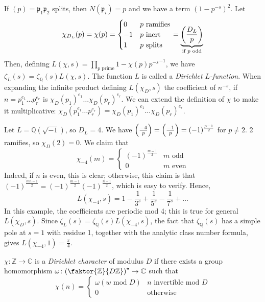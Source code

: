 If \( (p) = \mathfrak p_1 \mathfrak p_2 \) splits, then \( N(\mathfrak p_i) = p \) and we have a term \( (1 - p^{-s})^2 \).
Let
\[ \chi_{D_L}(p) = \chi(p) = \begin{cases}
    0 & p \text{ ramifies} \\
    -1 & p \text{ inert} \\
    1 & p \text{ splits}
\end{cases} = \underbrace{\qty(\frac{D_L}{p})}_{\mathclap{\text{if } p \text{ odd}}} \]
Then, defining \( L(\chi,s) = \prod_{p \text{ prime}} {1 - \chi(p) p^{-s}}^{-1} \), we have \( \zeta_L(s) = \zeta_{\mathbb Q}(s) L(\chi,s) \).
The function \( L \) is called a \emph{Dirichlet \( L \)-function}.
When expanding the infinite product defining \( L(\chi_D, s) \) the coefficient of \( n^{-s} \), if \( n = p_1^{e_1} \dots p_r^{e_r} \) is \( \chi_D(p_1)^{e_1} \dots \chi_D(p_r)^{e_r} \).
We can extend the definition of \( \chi \) to make it multiplicative: \( \chi_D(p_1^{e_1} \dots p_r^{e_r}) = \chi_D(p_1)^{e_1} \dots \chi_D(p_r)^{e_r} \).
\begin{example}
    Let \( L = \mathbb Q(\sqrt{-1}) \), so \( D_L = 4 \).
    We have \( \qty(\frac{-4}{p}) = \qty(\frac{-1}{p}) = (-1)^{\frac{p-1}{2}} \) for \( p \neq 2 \).
    2 ramifies, so \( \chi_D(2) = 0 \).
    We claim that
    \[ \chi_{-4}(m) = \begin{cases}
        (-1)^{\frac{m-1}{2}} & m \text{ odd} \\
        0 & m \text{ even}
    \end{cases} \]
    Indeed, if \( n \) is even, this is clear; otherwise, this claim is that \( (-1)^{\frac{mn-1}{2}} = (-1)^{\frac{m-1}{2}} (-1)^{\frac{n-1}{2}} \), which is easy to verify.
    Hence,
    \[ L(\chi_{-4}, s) = 1 - \frac{1}{3^s} + \frac{1}{5^s} - \frac{1}{7^s} + \dots \]
    In this example, the coefficients are periodic mod 4; this is true for general \( L(\chi_D, s) \).
    Since \( \zeta_L(s) = \zeta_{\mathbb Q}(s) L(\chi_{-4}, s) \), the fact that \( \zeta_{\mathbb Q}(s) \) has a simple pole at \( s = 1 \) with residue 1, together with the analytic class number formula, gives \( L(\chi_{-4}, 1) = \frac{\pi}{4} \).
\end{example}
\begin{definition}
    \( \chi \colon \mathbb Z \to \mathbb C \) is a \emph{Dirichlet character} of modulus \( D \) if there exists a group homomorphism \( \omega \colon \qty(\faktor{\mathbb Z}{D\mathbb Z})^\star \to \mathbb C \) such that
    \[ \chi(n) = \begin{cases}
        \omega(w \text{ mod } D) & n \text{ invertible mod } D \\
        0 & \text{otherwise}
    \end{cases} \]
\end{definition}
